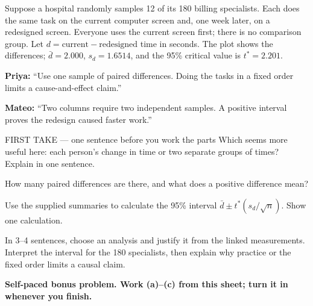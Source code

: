 \documentclass[14pt]{extarticle}
\begin{document}
\pagestyle{empty}


\noindent\begin{minipage}[t]{0.57\linewidth}
\vspace{0pt}
Suppose a hospital randomly samples 12 of its 180 billing specialists. Each does the same task on the current computer screen and, one week later, on a redesigned screen. Everyone uses the current screen first; there is no comparison group. Let $d=\text{current}-\text{redesigned}$ time in seconds. The plot shows the differences; $\bar d=2.000$, $s_d=1.6514$, and the 95\% critical value is $t^*=2.201$.\par\smallskip \textbf{Priya:} ``Use one sample of paired differences. Doing the tasks in a fixed order limits a cause-and-effect claim.''\par \textbf{Mateo:} ``Two columns require two independent samples. A positive interval proves the redesign caused faster work.''\par
\end{minipage}\hfill
\begin{minipage}[t]{0.40\linewidth}
\vspace{0pt}
\begin{center}
\end{center}
\end{minipage}

\begin{firsttakebox}{FIRST TAKE --- one sentence before you work the parts}
Which seems more useful here: each person's change in time or two separate groups of times? Explain in one sentence.
\end{firsttakebox}

\begin{description}[leftmargin=1.15in, labelwidth=1in, itemsep=2pt, topsep=2pt]
  \item[\dokbadge{1}~(a)] How many paired differences are there, and what does a positive difference mean?
  \item[\dokbadge{2}~(b)] Use the supplied summaries to calculate the 95\% interval $\bar d\pm t^*(s_d/\sqrt n)$. Show one calculation.
  \item[\dokbadge{3}~(c)] In 3--4 sentences, choose an analysis and justify it from the linked measurements. Interpret the interval for the 180 specialists, then explain why practice or the fixed order limits a causal claim.
\end{description}

\vfill
\textbf{Self-paced bonus problem. Work (a)--(c) from this sheet; turn it in whenever you finish.}
\end{document}
